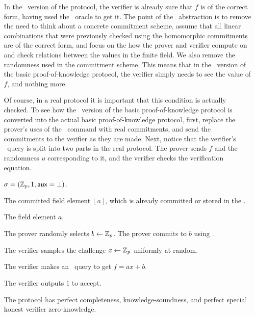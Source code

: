 In the \ILC\ version of the protocol, the verifier is already sure that $f$ is of the correct form, having used the \ILCopen\ oracle to get it. The point of the \ILC\ abstraction is to remove the need to think about a concrete commitment scheme, assume that all linear combinations that were previously checked using the homomorphic commitments are of the correct form, and focus on the how the prover and verifier compute on and check relations between the values in the finite field. We also remove the randomness used in the commitment scheme. This means that in the \ILC\ version of the basic proof-of-knowledge protocol, the verifier simply needs to see the value of $f$, and nothing more.

Of course, in a real protocol it is important that this condition is actually checked. To see how the \ILC\ version of the basic proof-of-knowledge protocol is converted into the actual basic proof-of-knowledge protocol, first, replace the prover's uses of the \ILCcommit\ command with real commitments, and send the commitments to the verifier as they are made. Next, notice that the verifier's \ILCopen\ query is split into two parts in the real protocol. The prover sends $f$ and the randomness $u$ corresponding to it, and the verifier checks the verification equation.

\begin{description} \label{prot:ILCschnorr}
\item[Common Reference String:] $\mathsf{\sigma}=(\mathbb{Z}_p,1,\mathsf{aux}=\bot)$.
\item[Instance:] The committed field element $[a]$, which is already committed or stored in the \ILC.
%
\item[Prover's witness:] The field element $a$.
%
\item[\ P:] The prover randomly selects $b \gets \mathbb{Z}_p$. The prover commits to $b$ using \ILCcommit.

\item[V:] The verifier samples the challenge $x \gets \mathbb{Z}_p$ uniformly at random.

The verifier makes an \ILCopen\ query to get $f = ax+b$.

The verifier outputs $1$ to accept.
\end{description}

\begin{lemma} \label{proof:ILCschnorr}
The protocol has perfect completeness, knowledge-soundness, and perfect special honest verifier zero-knowledge.
\end{lemma}

